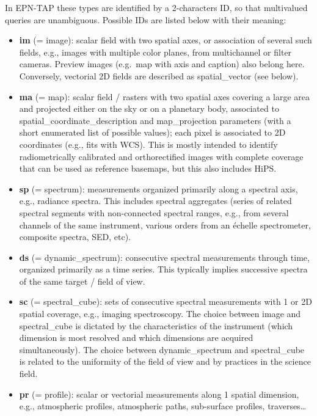 \documentclass[11pt,a4paper]{ivoa}
\begin{document}
In EPN-TAP these types are identified by a 2-characters ID, so that
multivalued queries are unambiguous. Possible IDs are listed below with
their meaning:

\begin{itemize}

\item \textbf{im }(= image): scalar field with two spatial axes, or
association of several such fields, e.g., images with multiple color
planes, from multichannel or filter cameras. Preview images (e.g.\ map
with axis and caption) also belong here. Conversely, vectorial 2D fields
are described as spatial\_vector (see below).

\item \textbf{ma }(= map): scalar field / rasters with two spatial axes
covering a large area and projected either on the sky or on a planetary
body, associated to spatial\_coordinate\_description and map\_projection
parameters (with a short enumerated list of possible values); each pixel
is associated to 2D coordinates (e.g., fits with WCS). This is mostly
intended to identify radiometrically calibrated and orthorectified
images with complete coverage that can be used as reference basemaps,
but this also includes HiPS.

\item \textbf{sp }(= spectrum): measurements organized primarily along a
spectral axis, e.g., radiance spectra. This includes spectral aggregates
(series of related spectral segments with non-connected spectral ranges,
e.g., from several channels of the same instrument, various orders from
an échelle spectrometer, composite spectra, SED, etc).

\item \textbf{ds }(= dynamic\_spectrum): consecutive spectral measurements
through time, organized primarily as a time series. This typically
implies successive spectra of the same target / field of view.

\item \textbf{sc }(= spectral\_cube): sets of consecutive
spectral measurements with 1 or 2D spatial coverage, e.g., imaging
spectroscopy. The choice between image and spectral\_cube is dictated by
the characteristics of the instrument (which dimension is most resolved
and which dimensions are acquired simultaneously). The choice between
dynamic\_spectrum and spectral\_cube is related to the uniformity of
the field of view and by practices in the science field.

\item \textbf{pr }(= profile): scalar or vectorial measurements along
1 spatial dimension, e.g., atmospheric profiles, atmospheric paths,
sub-surface profiles, traverses…


\end{itemize}
\end{document}
